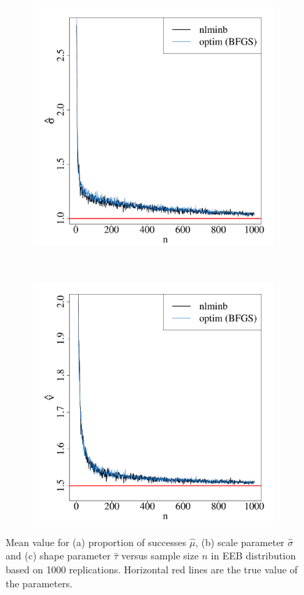 \documentclass[nojss]{jss}
\begin{document}
\begin{figure}[H]
\begin{subfigure}[h]{0.49\textwidth}
        \includegraphics[width=\textwidth]{article-EEBb}
        \caption{\label{fig:EEBb}}
    \end{subfigure}
    ~
    \begin{subfigure}[h]{0.49\textwidth}
        \includegraphics[width=\textwidth]{article-EEBc}
        \caption{\label{fig:EEBc}}
    \end{subfigure}
\caption{\label{fig:EEB} Mean value for (a) proportion of successes $\hat{\mu}$, (b) scale parameter $\hat{\sigma}$ and (c) shape parameter $\hat{\tau}$ versus sample size $n$ in EEB distribution based on 1000 replications. Horizontal red lines are the true value of the parameters.}
\vspace{1.5cm}
\end{figure}
\end{document}
